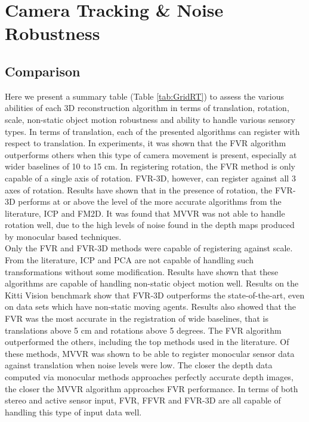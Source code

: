 \section{Camera Tracking \& Noise Robustness}
\label{Sec:CamTransTrackExp}


\subsection{Comparison}

Here we present a summary table (Table \ref{tab:GridRT}) to assess the various abilities of each 3D reconstruction algorithm in terms of translation, rotation, scale, non-static object motion robustness and ability to handle various sensory types. In terms of translation, each of the presented algorithms can register with respect to translation. In experiments, it was shown that the FVR algorithm outperforms others when this type of camera movement is present, especially at wider baselines of 10 to 15 cm. In registering rotation, the FVR method is only capable of a single axis of rotation. FVR-3D, however, can register against all 3 axes of rotation. Results have shown that in the presence of rotation, the FVR-3D performs at or above the level of the more accurate algorithms from the literature, ICP and FM2D. It was found that MVVR was not able to handle rotation well, due to the high levels of noise found in the depth maps produced by monocular based techniques. \\

Only the FVR and FVR-3D methods were capable of registering against scale. From the literature, ICP and PCA are not capable of handling such transformations without some modification. Results have shown that these algorithms are capable of handling non-static object motion well. Results on the Kitti Vision benchmark show that FVR-3D outperforms the state-of-the-art, even on data sets which have non-static moving agents. Results also showed that the FVR was the most accurate in the registration of wide baselines, that is translations above 5 cm and rotations above 5 degrees. The FVR algorithm outperformed the others, including the top methods used in the literature. Of these methods, MVVR was shown to be able to register monocular sensor data against translation when noise levels were low. The closer the depth data computed via monocular methods approaches perfectly accurate depth images, the closer the MVVR algorithm approaches FVR performance. In terms of both stereo and active sensor input, FVR, FFVR and FVR-3D are all capable of handling this type of input data well. \\


